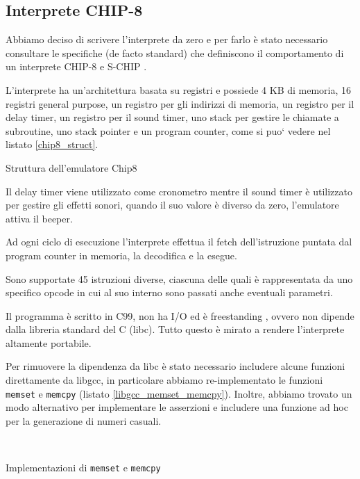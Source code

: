 \documentclass[a4paper]{article}
\begin{document}
\subsection{Interprete CHIP-8}

Abbiamo deciso di scrivere l'interprete da zero e per farlo è
stato necessario consultare le specifiche (de facto standard)
che definiscono il comportamento di un interprete
CHIP-8 \cite{cowgod:chip8} e S-CHIP \cite{cowgod:schip}.


L'interprete ha un'architettura basata su registri e possiede 4 KB
di memoria, 16 registri general purpose, un registro per gli
indirizzi di memoria, un registro per il delay timer,
un registro per il sound timer, uno stack per gestire le
chiamate a subroutine, uno stack pointer e un program counter, come si puo`
vedere nel listato \ref{chip8_struct}.

\begin{Listing} %
    \centering
    \caption{Struttura dell'emulatore Chip8}
    \label{chip8_struct}
\end{Listing}

Il delay timer viene utilizzato come cronometro mentre il sound
timer è utilizzato per gestire gli effetti sonori, quando il suo
valore è diverso da zero, l'emulatore attiva il beeper.

Ad ogni ciclo di esecuzione l'interprete effettua il fetch
dell'istruzione puntata dal program counter in memoria,
la decodifica e la esegue.

Sono supportate 45 istruzioni diverse, ciascuna delle
quali è rappresentata da uno specifico opcode in cui al suo interno
sono passati anche eventuali parametri.

Il programma è scritto in C99, non ha I/O ed è freestanding
\cite{n1256:conformance}, ovvero non dipende dalla libreria
standard del C (libc). Tutto questo è mirato a rendere l'interprete
altamente portabile.

Per rimuovere la dipendenza da libc è stato necessario includere
alcune funzioni direttamente da libgcc, in particolare abbiamo re-implementato
le funzioni \texttt{memset} e \texttt{memcpy}
(listato \ref{libgcc_memset_memcpy}). Inoltre, abbiamo trovato un modo
alternativo per implementare le asserzioni e includere una funzione ad hoc per
la generazione di numeri casuali.

\begin{Listing} %
\centering
\mbox{
  \quad
}
\caption{Implementazioni di \texttt{memset} e \texttt{memcpy}}
\label{libgcc_memset_memcpy}
\end{Listing}
\end{document}
